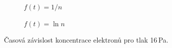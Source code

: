 \documentclass[a4paper,12pt]{article}
\begin{document}
\begin{figure}[h]
	\centering
	\begin{subfigure}[b]{.49\linewidth}
		\centering
		\caption{$f(t) = 1/n$}
	\end{subfigure}
	\begin{subfigure}[b]{.49\linewidth}
		\centering
		\caption{$f(t) = \ln n$}
	\end{subfigure}
	\caption{Časová závislost koncentrace elektronů pro tlak 16\,Pa.}
	\label{g:10Pa}
\end{figure}
\end{document}

